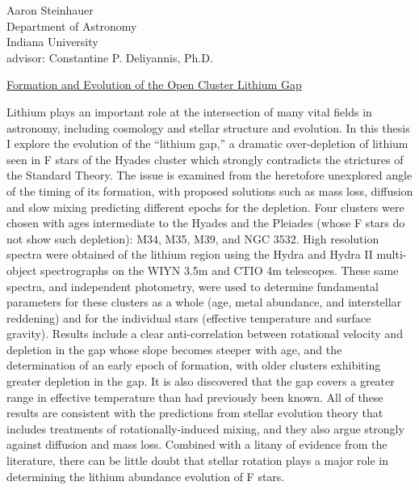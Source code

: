 \documentclass[letterpaper,11pt]{article}
\begin{document}
\pagestyle{empty}
\begin{center}
\begin{spacing}{1.0}
Aaron Steinhauer \\
\vspace{0.09in}Department of Astronomy \\
\vspace{0.09in}Indiana University \\

\vspace{0.09in}
advisor: Constantine P. Deliyannis, Ph.D. \\
\end{spacing}
\vspace{0.2in}\underline {Formation and Evolution of the Open Cluster Lithium Gap}

\end{center}

Lithium plays an important role at the intersection of many vital fields in
astronomy, including cosmology and stellar structure and evolution.  In this
thesis I explore the evolution of the ``lithium gap,'' a dramatic over-depletion
of lithium seen in F stars of the Hyades cluster which strongly contradicts the strictures of
the Standard Theory.  The issue is examined from the heretofore unexplored angle
of the timing of its formation, with proposed solutions such as mass loss, diffusion
and slow mixing predicting different epochs for the depletion.  Four clusters
were chosen with ages intermediate to the Hyades and the Pleiades (whose F stars 
do not show such depletion): M34, M35, M39, and NGC 3532.  High resolution 
spectra were obtained of the lithium region using the Hydra and Hydra II 
multi-object spectrographs
on the WIYN 3.5m and CTIO 4m telescopes.  These same spectra, and independent
photometry, were used to determine fundamental parameters for these clusters as
a whole (age, metal abundance, and interstellar reddening) and for the individual
stars (effective temperature and surface gravity).  Results include a clear 
anti-correlation between rotational velocity and depletion in the gap whose slope
becomes steeper with age, 
and the determination of an early epoch of formation, with older clusters exhibiting
greater depletion in the gap.  It is also 
discovered that the gap covers a greater range in effective temperature than
had previously been known.  All of these results are consistent with the predictions
from stellar evolution theory that includes treatments of rotationally-induced mixing, 
and they also argue strongly against diffusion and 
mass loss.  Combined with a litany of evidence from the literature, there
can be little doubt that stellar rotation plays a major role in determining the
lithium abundance evolution of F stars.
\end{document}
